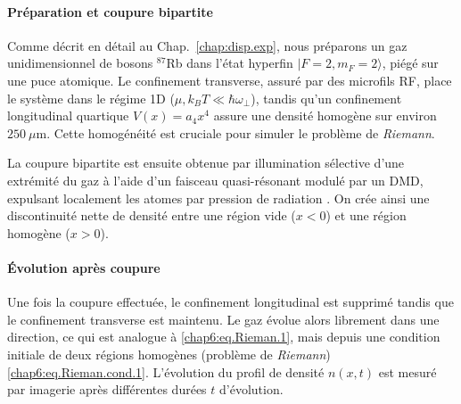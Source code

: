 \paragraph{Préparation et coupure bipartite} 
Comme décrit en détail au Chap.~\ref{chap:disp.exp}, nous préparons un gaz unidimensionnel de bosons $^{87}$Rb dans l’état hyperfin $|F=2,m_F=2\rangle$, piégé sur une puce atomique. Le confinement transverse, assuré par des microfils RF, place le système dans le régime 1D (\(\mu, k_B T \ll \hbar \omega_\perp\)), tandis qu’un confinement longitudinal quartique $V(x)=a_4 x^4$ assure une densité homogène sur environ $250~\mu$m. Cette homogénéité est cruciale pour simuler le problème de \emph{Riemann}.

\medskip 

La coupure bipartite est ensuite obtenue par illumination sélective d’une extrémité du gaz à l’aide d’un faisceau quasi-résonant modulé par un \gls{DMD}, expulsant localement les atomes par pression de radiation \cite{PhysRevLett.133.113402}. On crée ainsi une discontinuité nette de densité entre une région vide ($x<0$) et une région homogène ($x>0$).  


\paragraph{Évolution après coupure}
Une fois la coupure effectuée, le confinement longitudinal est supprimé tandis que le confinement transverse est maintenu. Le gaz évolue alors librement dans une direction, ce qui est analogue  à  \eqref{chap6:eq.Rieman.1}, mais depuis une condition initiale de deux régions homogènes (problème de \emph{Riemann}) \eqref{chap6:eq.Rieman.cond.1}. L’évolution du profil de densité $n(x,t)$ est mesuré par imagerie après différentes durées $t$ d’évolution.






